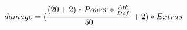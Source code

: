 \documentclass[preview]{standalone}
\begin{document}
\begin{align*}
\special{dvisvgm:raw <g id='unique000'>}damage = (\frac{(20 + 2) * Power * \frac{Atk}{Def}}{50} + 2) * Extras\special{dvisvgm:raw </g>}
\end{align*}
\end{document}
